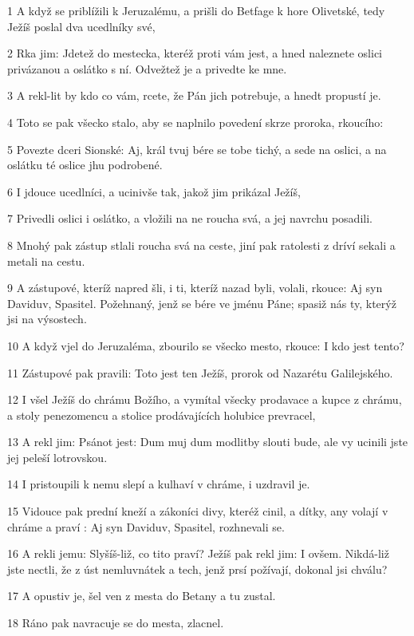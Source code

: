 \par 1 A když se priblížili k Jeruzalému, a prišli do Betfage k hore Olivetské, tedy Ježíš poslal dva ucedlníky své,
\par 2 Rka jim: Jdetež do mestecka, kteréž proti vám jest, a hned naleznete oslici privázanou a oslátko s ní. Odvežtež je a privedte ke mne.
\par 3 A rekl-lit by kdo co vám, rcete, že Pán jich potrebuje, a hnedt propustí je.
\par 4 Toto se pak všecko stalo, aby se naplnilo povedení skrze proroka, rkoucího:
\par 5 Povezte dceri Sionské: Aj, král tvuj bére se tobe tichý, a sede na oslici, a na oslátku té oslice jhu podrobené.
\par 6 I jdouce ucedlníci, a ucinivše tak, jakož jim prikázal Ježíš,
\par 7 Privedli oslici i oslátko, a vložili na ne roucha svá, a jej navrchu posadili.
\par 8 Mnohý pak zástup stlali roucha svá na ceste, jiní pak ratolesti z dríví sekali a metali na cestu.
\par 9 A zástupové, kteríž napred šli, i ti, kteríž nazad byli, volali, rkouce: Aj syn Daviduv, Spasitel. Požehnaný, jenž se bére ve jménu Páne; spasiž nás ty, kterýž jsi na výsostech.
\par 10 A když vjel do Jeruzaléma, zbourilo se všecko mesto, rkouce: I kdo jest tento?
\par 11 Zástupové pak pravili: Toto jest ten Ježíš, prorok od Nazarétu Galilejského.
\par 12 I všel Ježíš do chrámu Božího, a vymítal všecky prodavace a kupce z chrámu, a stoly penezomencu a stolice prodávajících holubice prevracel,
\par 13 A rekl jim: Psánot jest: Dum muj dum modlitby slouti bude, ale vy ucinili jste jej peleší lotrovskou.
\par 14 I pristoupili k nemu slepí a kulhaví v chráme, i uzdravil je.
\par 15 Vidouce pak prední kneží a zákoníci divy, kteréž cinil, a dítky, any volají v chráme a praví : Aj syn Daviduv, Spasitel, rozhnevali se.
\par 16 A rekli jemu: Slyšíš-liž, co tito praví? Ježíš pak rekl jim: I ovšem. Nikdá-liž jste nectli, že z úst nemluvnátek a tech, jenž prsí požívají, dokonal jsi chválu?
\par 17 A opustiv je, šel ven z mesta do Betany a tu zustal.
\par 18 Ráno pak navracuje se do mesta, zlacnel.
